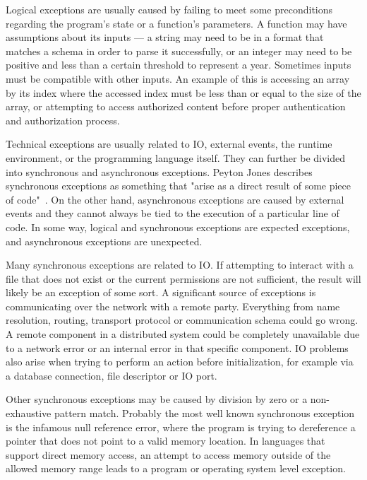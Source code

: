 Logical exceptions are usually caused by failing to meet some preconditions regarding the program's state or a function's parameters. A function may have assumptions about its inputs --- a string may need to be in a format that matches a schema in order to parse it successfully, or an integer may need to be positive and less than a certain threshold to represent a year. Sometimes inputs must be compatible with other inputs. An example of this is accessing an array by its index where the accessed index must be less than or equal to the size of the array, or attempting to access authorized content before proper authentication and authorization process.

Technical exceptions are usually related to IO, external events, the runtime environment, or the programming language itself. They can further be divided into synchronous and asynchronous exceptions. Peyton Jones describes synchronous exceptions as something that "arise as a direct result of some piece of code"~\cite{akward-squad}.  On the other hand, asynchronous exceptions are caused by external events and they cannot always be tied to the execution of a particular line of code. In some way, logical and synchronous exceptions are expected exceptions, and asynchronous exceptions are unexpected.

Many synchronous exceptions are related to IO. If attempting to interact with a file that does not exist or the current permissions are not sufficient, the result will likely be an exception of some sort. A significant source of exceptions is communicating over the network with a remote party. Everything from name resolution, routing, transport protocol or communication schema could go wrong. A remote component in a distributed system could be completely unavailable due to a network error or an internal error in that specific component. IO problems also arise when trying to perform an action before initialization, for example via a database connection, file descriptor or IO port.

Other synchronous exceptions may be caused by division by zero or a non-exhaustive pattern match. Probably the most well known synchronous exception is the infamous null reference error, where the program is trying to dereference a pointer that does not point to a valid memory location. In languages that support direct memory access, an attempt to access memory outside of the allowed memory range leads to a program or operating system level exception.~\cite{akward-squad}

